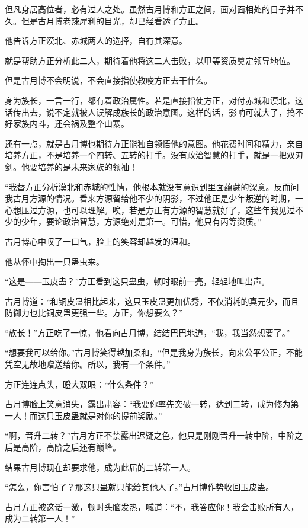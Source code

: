 \begin{this_body}
但凡身居高位者，必有过人之处。虽然古月博和方正之间，面对面相处的日子并不久。但是古月博老辣犀利的目光，却已经看透了方正。

他告诉方正漠北、赤城两人的选择，自有其深意。

就是帮助方正分析此二人，期待着他将这二人击败，以甲等资质奠定领导地位。

但是古月博不会明说，不会直接指使教唆方正去干什么。

身为族长，一言一行，都有着政治属性。若是直接指使方正，对付赤城和漠北，这话传出去，说不定就被人误解成族长的政治意图。这样的话，影响可就大了，搞不好家族内斗，还会祸及整个山寨。

还有一点，就是古月博也期待方正能独自领悟他的意图。他花费时间和精力，亲自培养方正，不是培养一个四转、五转的打手。没有政治智慧的打手，就是一把双刃剑。他要培养的是未来家族的领袖！

“我替方正分析漠北和赤城的性情，他根本就没有意识到里面蕴藏的深意。反而问我古月方源的情况。看来方源留给他不少的阴影，不过他正是少年叛逆的时期，一心想压过方源，也可以理解。唉，若是方正有方源的智慧就好了，这些年我见过不少的少年，要论政治智慧，方源绝对是第一。可惜，他只有丙等资质。”

古月博心中叹了一口气，脸上的笑容却越发的温和。

他从怀中掏出一只蛊虫来。

“这是——玉皮蛊？”方正看到这只蛊虫，顿时眼前一亮，轻轻地叫出声。

古月博道：“和铜皮蛊相比起来，这只玉皮蛊更加优秀，不仅消耗的真元少，而且防御力也比铜皮蛊更强一些。方正，你想要么？”

“族长！”方正吃了一惊，他看向古月博，结结巴巴地道，“我，我当然想要了。”

“想要我可以给你。”古月博笑得越加柔和，“但是我身为族长，向来公平公正，不能凭空无故地赠送给你。所以，我有一个条件。”

方正连连点头，瞪大双眼：“什么条件？”

古月博脸上笑意消失，露出肃容：“我要你率先突破一转，达到二转，成为修为第一人！而这只玉皮蛊就是对你的提前奖励。”

“啊，晋升二转？”古月方正不禁露出迟疑之色。他只是刚刚晋升一转中阶，中阶之后是高阶，高阶之后还有巅峰。

结果古月博现在却要求他，成为此届的二转第一人。

“怎么，你害怕了？那这只蛊就只能给其他人了。”古月博作势收回玉皮蛊。

古月方正被这话一激，顿时头脑发热，喊道：“不，我答应你！我会击败所有人，成为二转第一人！”


\end{this_body}

